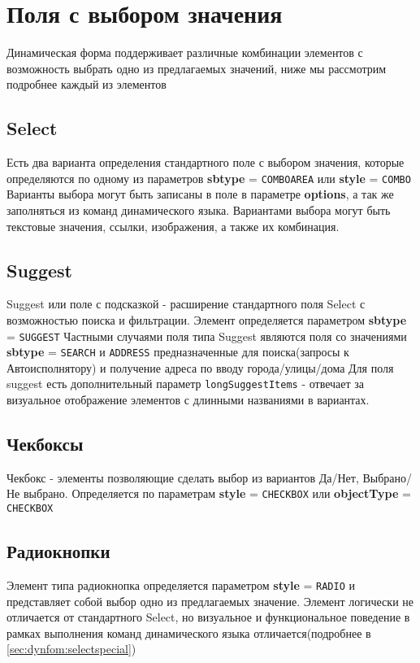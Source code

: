 \documentclass[../index.tex]{subfiles}
\begin{document}
\section{Поля с выбором значения}
    Динамическая форма поддерживает различные комбинации элементов с возможность выбрать одно из предлагаемых значений, ниже мы рассмотрим подробнее каждый из элементов
\subsection{Select}
    Есть два варианта определения стандартного поле с выбором значения, которые определяются по одному из параметров \textbf{sbtype} = \verb|COMBOAREA| или \textbf{style} = \verb|COMBO|
    Варианты выбора могут быть записаны в поле в параметре \textbf{options}, а так же заполняться из команд динамического языка. Вариантами выбора могут быть текстовые значения, ссылки, изображения, а также их комбинация.
\subsection{Suggest}\label{suggest}
    Suggest или поле с подсказкой - расширение стандартного поля Select с возможностью поиска и фильтрации.
    Элемент определяется параметром \textbf{sbtype} = \verb|SUGGEST|
    Частными случаями поля типа Suggest являются поля со значениями \textbf{sbtype} = \verb|SEARCH| и \verb|ADDRESS| предназначенные для поиска(запросы к Автоисполнятору) и получение адреса по вводу города/улицы/дома
    Для поля suggest есть дополнительный параметр \verb|longSuggestItems| - отвечает за визуальное отображение элементов с длинными названиями в вариантах.
\subsection{Чекбоксы}
    Чекбокс - элементы позволяющие сделать выбор из вариантов Да/Нет, Выбрано/Не выбрано.
    Определяется по параметрам \textbf{style} = \verb|CHECKBOX| или \textbf{objectType} = \verb|CHECKBOX|
\subsection{Радиокнопки}
    Элемент типа радиокнопка определяется параметром \textbf{style} = \verb|RADIO| и представляет собой выбор одно из предлагаемых значение.
    Элемент логически не отличается от стандартного Select, но визуальное и функциональное поведение в рамках выполнения команд динамического языка отличается(подробнее в \autoref{sec:dynfom:selectspecial})
\end{document}
